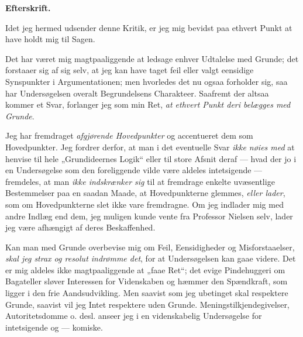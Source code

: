 \documentclass[12pt,a4paper]{book}
\newcommand{\opage}[1]{\marginnote{\footnotesize\textit{[#1]}}}
\begin{document}
\begin{center}\textbf{Efterskrift.}\end{center}

Idet jeg hermed udsender denne Kritik, er jeg mig
bevidst paa ethvert Punkt at have holdt mig til Sagen.

Det har været mig magtpaaliggende at ledsage enhver
Udtalelse med Grunde; det forstaaer sig af sig selv,
at jeg kan have taget feil eller valgt eensidige Synspunkter
i Argumentationen; men hvorledes det nu ogsaa
forholder sig, saa har Undersøgelsen overalt Begrundelsens
Charakteer. Saafremt der altsaa kommer et
Svar, forlanger jeg som min Ret, \emph{at ethvert Punkt
deri belægges med Grunde}.

Jeg har fremdraget \emph{afgjørende Hovedpunkter}
og accentueret dem som Hovedpunkter. Jeg fordrer
derfor, at man i det eventuelle Svar \emph{ikke nøies med}
at henvise til hele „Grundideernes Logik“ eller til store
Afsnit deraf --- hvad der jo i en Undersøgelse som den
\opage{97}\setcounter{footnote}{0}foreliggende vilde være aldeles intetsigende --- fremdeles,
at man \emph{ikke indskrænker sig} til at fremdrage enkelte
uvæsentlige Bestemmelser paa en saadan Maade, at
Hovedpunkterne glemmes, \emph{eller lader}, som om Hovedpunkterne
slet ikke vare fremdragne. Om jeg indlader
mig med andre Indlæg end dem, jeg muligen kunde
vente fra Professor Nielsen selv, lader jeg være afhængigt
af deres Beskaffenhed.

Kan man med Grunde overbevise mig om Feil,
Eensidigheder og Misforstaaelser, \emph{skal jeg strax og
resolut indrømme det}, for at Undersøgelsen kan
gaae videre. Det er mig aldeles ikke magtpaaliggende
at „faae Ret“; det evige Pindehuggeri om Bagateller
sløver Interessen for Videnskaben og hæmmer den Spændkraft,
som ligger i den frie Aandsudvikling. Men saavist
som jeg ubetinget skal respektere Grunde, saavist vil
jeg Intet respektere uden Grunde. Meningstilkjendegivelser,
Autoritetsdomme o. desl. anseer jeg i en videnskabelig
Undersøgelse for intetsigende og --- komiske.
\end{document}

